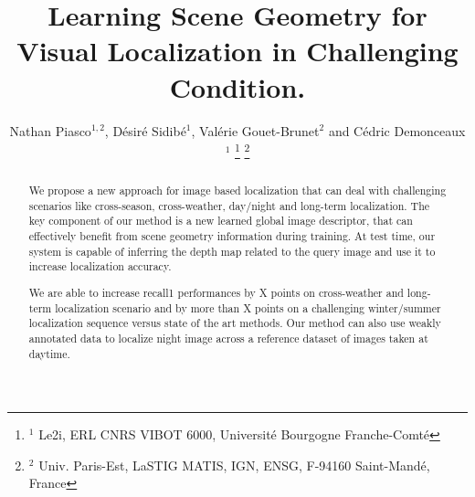 \documentclass[letterpaper, 10 pt, conference]{ieeeconf}  %
\title{\LARGE \bf
Learning Scene Geometry for \\
Visual Localization in Challenging Condition.
}
\author{Nathan Piasco${}^{1,2}$, D\'esir\'e Sidib\'e${}^1$, Val\'erie Gouet-Brunet${}^2$ and C\'edric Demonceaux${}^1$%
\thanks{${}^1$ Le2i, ERL CNRS VIBOT 6000,  Universit\'e  Bourgogne Franche-Comt\'e}%
\thanks{${}^2$ Univ. Paris-Est, LaSTIG MATIS, IGN, ENSG, F-94160 Saint-Mand\'e, France}%
}
\begin{document}
\newcommand{\norm}[1]{\left\lVert#1\right\rVert}
\newcommand\numberthis{\addtocounter{equation}{1}\tag{\theequation}}

\maketitle
\thispagestyle{empty}
\pagestyle{empty}


\begin{abstract}
We propose a new approach for image based localization that can deal with challenging scenarios like cross-season, cross-weather, day/night and long-term localization. The key component of our method is a new learned global image descriptor, that can effectively benefit from scene geometry information during training. At test time, our system is capable of inferring the depth map related to the query image and use it to increase localization accuracy.

We are able to increase recall\@1 performances by X points on cross-weather and long-term localization scenario and by more than X points on a challenging winter/summer localization sequence versus state of the art methods. Our method can also use weakly annotated data to localize night image across a reference dataset of images taken at daytime.
\end{abstract}










\end{document}
